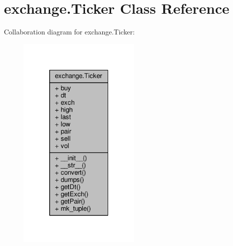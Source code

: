 \hypertarget{classexchange_1_1_ticker}{}\section{exchange.\+Ticker Class Reference}
\label{classexchange_1_1_ticker}


Collaboration diagram for exchange.\+Ticker\+:\nopagebreak
\begin{figure}[H]
\begin{center}
\leavevmode
\includegraphics[width=169pt]{classexchange_1_1_ticker__coll__graph}
\end{center}
\end{figure}
